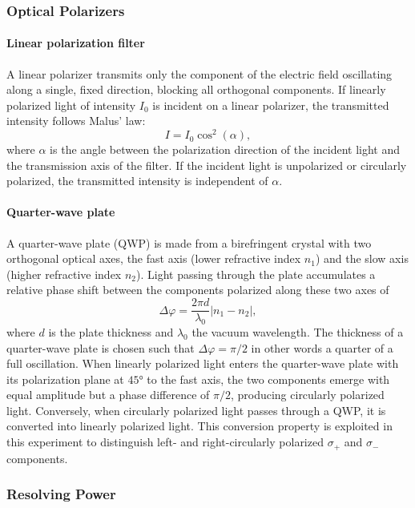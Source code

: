 \documentclass{article}
\begin{document}
\subsubsection{Optical Polarizers}

\paragraph{Linear polarization filter} A linear polarizer transmits only the component of the electric field oscillating along a single, fixed direction, blocking all orthogonal components. If linearly polarized light of intensity $I_0$ is incident on a linear polarizer, the transmitted intensity follows Malus' law:
\begin{equation}
    I = I_0\cos^2(\alpha),
\end{equation}
where $\alpha$ is the angle between the polarization direction of the incident light and the transmission axis of the filter. If the incident light is unpolarized or circularly polarized, the transmitted intensity is independent of $\alpha$.

\paragraph{Quarter-wave plate} A quarter-wave plate (QWP) is made from a birefringent crystal with two orthogonal optical axes, the fast axis (lower refractive index $n_1$) and the slow axis (higher refractive index $n_2$). Light passing through the plate accumulates a relative phase shift between the components polarized along these two axes of
\begin{equation}
    \Delta\varphi = \frac{2\pi d}{\lambda_0}|n_1 - n_2|,
\end{equation}
where $d$ is the plate thickness and $\lambda_0$ the vacuum wavelength. The thickness of a quarter-wave plate is chosen such that $\Delta\varphi = \pi/2$ in other words a quarter of a full oscillation. When linearly polarized light enters the quarter-wave plate with its polarization plane at $45°$ to the fast axis, the two components emerge with equal amplitude but a phase difference of $\pi/2$, producing circularly polarized light. Conversely, when circularly polarized light passes through a QWP, it is converted into linearly polarized light. This conversion property is exploited in this experiment to distinguish left- and right-circularly polarized $\sigma_+$ and $\sigma_-$ components.

\subsubsection{Resolving Power}
\end{document}
